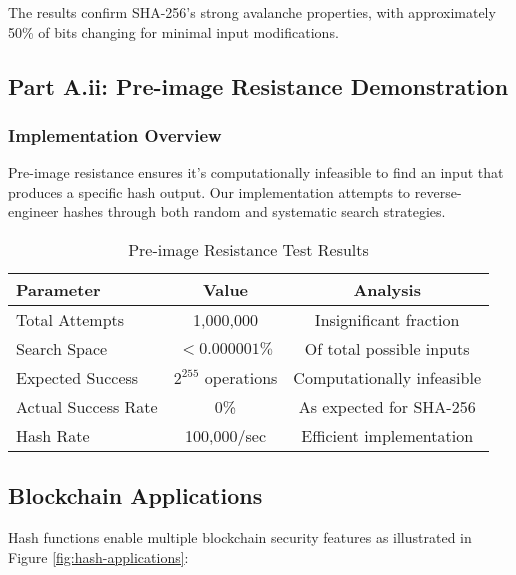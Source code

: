 \documentclass[12pt,a4paper]{article}
\begin{document}
The results confirm SHA-256's strong avalanche properties, with approximately 50\% of bits changing for minimal input modifications.

\subsection{Part A.ii: Pre-image Resistance Demonstration}

\subsubsection{Implementation Overview}

Pre-image resistance ensures it's computationally infeasible to find an input that produces a specific hash output. Our implementation attempts to reverse-engineer hashes through both random and systematic search strategies.

\begin{table}[h]
\centering
\begin{tabular}{|l|c|c|}
\hline
\textbf{Parameter} & \textbf{Value} & \textbf{Analysis} \\
\hline
Total Attempts & 1,000,000 & Insignificant fraction \\
\hline
Search Space & $< 0.000001\%$ & Of total possible inputs \\
\hline
Expected Success & $2^{255}$ operations & Computationally infeasible \\
\hline
Actual Success Rate & 0\% & As expected for SHA-256 \\
\hline
Hash Rate & 100,000/sec & Efficient implementation \\
\hline
\end{tabular}
\caption{Pre-image Resistance Test Results}
\label{tab:preimage-results}
\end{table}

\subsection{Blockchain Applications}

Hash functions enable multiple blockchain security features as illustrated in Figure \ref{fig:hash-applications}:
\end{document}
